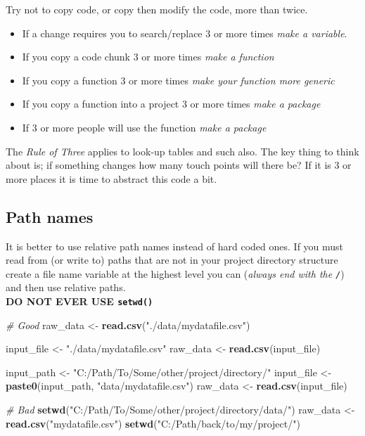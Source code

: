 \documentclass[]{book}
\newenvironment{Shaded}{\begin{snugshade}}{\end{snugshade}}
\newcommand{\KeywordTok}[1]{\textcolor[rgb]{0.13,0.29,0.53}{\textbf{#1}}}
\newcommand{\StringTok}[1]{\textcolor[rgb]{0.31,0.60,0.02}{#1}}
\newcommand{\CommentTok}[1]{\textcolor[rgb]{0.56,0.35,0.01}{\textit{#1}}}
\newcommand{\NormalTok}[1]{#1}
\providecommand{\tightlist}{%
  \setlength{\itemsep}{0pt}\setlength{\parskip}{0pt}}
\begin{document}
Try not to copy code, or copy then modify the code, more than twice.

\begin{itemize}
\tightlist
\item
  If a change requires you to search/replace 3 or more times \emph{make
  a variable}.
\item
  If you copy a code chunk 3 or more times \emph{make a function}
\item
  If you copy a function 3 or more times \emph{make your function more
  generic}
\item
  If you copy a function into a project 3 or more times \emph{make a
  package}
\item
  If 3 or more people will use the function \emph{make a package}
\end{itemize}

The \emph{Rule of Three} applies to look-up tables and such also. The
key thing to think about is; if something changes how many touch points
will there be? If it is 3 or more places it is time to abstract this
code a bit.

\subsection{Path names}\label{path-names}

It is better to use relative path names instead of hard coded ones. If
you must read from (or write to) paths that are not in your project
directory structure create a file name variable at the highest level you
can (\emph{always end with the \texttt{/}}) and then use relative
paths.\\
\textbf{DO NOT EVER USE \texttt{setwd()}}

\begin{Shaded}
\begin{Highlighting}[]
\CommentTok{# Good}
\NormalTok{raw_data <-}\StringTok{ }\KeywordTok{read.csv}\NormalTok{(}\StringTok{"./data/mydatafile.csv"}\NormalTok{) }

\NormalTok{input_file <-}\StringTok{ "./data/mydatafile.csv"}
\NormalTok{raw_data <-}\StringTok{ }\KeywordTok{read.csv}\NormalTok{(input_file)  }

\NormalTok{input_path <-}\StringTok{ "C:/Path/To/Some/other/project/directory/"}
\NormalTok{input_file <-}\StringTok{ }\KeywordTok{paste0}\NormalTok{(input_path, }\StringTok{"data/mydatafile.csv"}\NormalTok{)}
\NormalTok{raw_data <-}\StringTok{ }\KeywordTok{read.csv}\NormalTok{(input_file)}

\CommentTok{# Bad}
\KeywordTok{setwd}\NormalTok{(}\StringTok{"C:/Path/To/Some/other/project/directory/data/"}\NormalTok{)}
\NormalTok{raw_data <-}\StringTok{ }\KeywordTok{read.csv}\NormalTok{(}\StringTok{"mydatafile.csv"}\NormalTok{)}
\KeywordTok{setwd}\NormalTok{(}\StringTok{"C:/Path/back/to/my/project/"}\NormalTok{)}
\end{Highlighting}
\end{Shaded}
\end{document}
